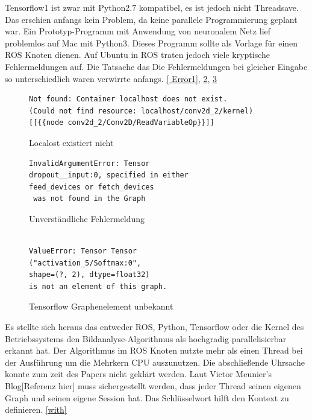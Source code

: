 \documentclass[conference]{IEEEtran}
\begin{document}
Tensorflow1 ist zwar mit Python2.7 kompatibel, es ist jedoch nicht 
Threadsave. Das erschien anfangs kein Problem, da keine parallele 
Programmierung geplant war. Ein Prototyp-Programm mit Anwendung von 
neuronalem Netz lief problemlos auf Mac mit Python3. Dieses Programm 
sollte als Vorlage für einen ROS Knoten dienen. Auf Ubuntu in ROS traten 
jedoch viele kryptische Fehlermeldungen auf.  Die Tatsache das Die 
Fehlermeldungen bei gleicher Eingabe so unterschiedlich waren verwirrte 
anfangs. \ref{ Error1}, \ref{Error2}, \ref{Error3}

\begin{figure}
	\centering
	\begin{verbatim}
Not found: Container localhost does not exist. 
(Could not find resource: localhost/conv2d_2/kernel)
[[{{node conv2d_2/Conv2D/ReadVariableOp}}]]
\end{verbatim}
\label{Error1}
\caption{Localost existiert nicht}
\end{figure}

\begin{figure}
	\centering
	\begin{verbatim}
InvalidArgumentError: Tensor 
dropout__input:0, specified in either 
feed_devices or fetch_devices
 was not found in the Graph
\end{verbatim}
\label{Error2}
\caption{Unverständliche Fehlermeldung}
\end{figure}



\begin{figure}
\centering
\begin{verbatim}

ValueError: Tensor Tensor
("activation_5/Softmax:0",
shape=(?, 2), dtype=float32) 
is not an element of this graph.
\end{verbatim}
\label{Error3}
\caption{Tensorflow Graphenelement unbekannt}
\end{figure}

Es stellte sich heraus das entweder ROS, Python, Tensorflow oder die Kernel 
des Betriebssystems den Bildanalyse-Algorithmus als hochgradig 
parallelisierbar erkannt hat. Der Algorithmus im  ROS Knoten nutzte mehr 
als einen Thread bei der Ausführung um die Mehrkern CPU auszunutzen. 
Die abschließende Uhrsache konnte zum zeit des Papers nicht geklärt 
werden.
Laut Victor Meunier's Blog[Referenz hier] %
muss sichergestellt werden, dass jeder Thread seinen eigenen Graph und seinen eigene Session hat. Das Schlüsselwort  hilft den Kontext zu definieren. \ref{with} \\
\end{document}
